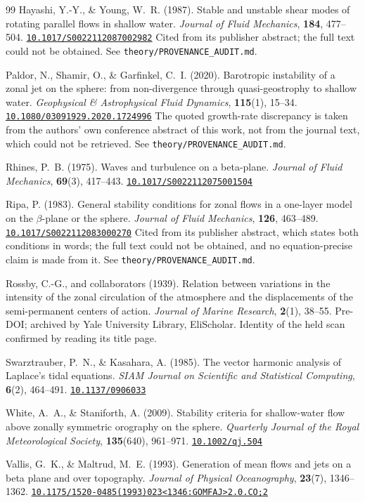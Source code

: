 \documentclass[11pt,a4paper]{article}
\newcommand{\doilink}[1]{\href{https://doi.org/#1}{\nolinkurl{#1}}}
\newcommand{\file}[1]{\texttt{\nolinkurl{#1}}}
\begin{document}
\begin{thebibliography}{99}
Hayashi, Y.-Y., \& Young, W.~R. (1987).
Stable and unstable shear modes of rotating parallel flows in shallow water.
\emph{Journal of Fluid Mechanics}, \textbf{184}, 477--504.
\doilink{10.1017/S0022112087002982}
Cited from its publisher abstract; the full text could not be obtained. See
\file{theory/PROVENANCE_AUDIT.md}.

Paldor, N., Shamir, O., \& Garfinkel, C.~I. (2020).
Barotropic instability of a zonal jet on the sphere: from non-divergence through
quasi-geostrophy to shallow water.
\emph{Geophysical \& Astrophysical Fluid Dynamics}, \textbf{115}(1), 15--34.
\doilink{10.1080/03091929.2020.1724996}
The quoted growth-rate discrepancy is taken from the authors' own conference
abstract of this work, not from the journal text, which could not be retrieved.
See \file{theory/PROVENANCE_AUDIT.md}.

Rhines, P.~B. (1975).
Waves and turbulence on a beta-plane.
\emph{Journal of Fluid Mechanics}, \textbf{69}(3), 417--443.
\doilink{10.1017/S0022112075001504}

Ripa, P. (1983).
General stability conditions for zonal flows in a one-layer model on the
$\beta$-plane or the sphere.
\emph{Journal of Fluid Mechanics}, \textbf{126}, 463--489.
\doilink{10.1017/S0022112083000270}
Cited from its publisher abstract, which states both conditions in words; the
full text could not be obtained, and no equation-precise claim is made from it.
See \file{theory/PROVENANCE_AUDIT.md}.

Rossby, C.-G., and collaborators (1939).
Relation between variations in the intensity of the zonal circulation of the
atmosphere and the displacements of the semi-permanent centers of action.
\emph{Journal of Marine Research}, \textbf{2}(1), 38--55.
Pre-DOI; archived by Yale University Library, EliScholar. Identity of the held
scan confirmed by reading its title page.

Swarztrauber, P.~N., \& Kasahara, A. (1985).
The vector harmonic analysis of Laplace's tidal equations.
\emph{SIAM Journal on Scientific and Statistical Computing}, \textbf{6}(2),
464--491. \doilink{10.1137/0906033}

White, A.~A., \& Staniforth, A. (2009).
Stability criteria for shallow-water flow above zonally symmetric orography on
the sphere.
\emph{Quarterly Journal of the Royal Meteorological Society}, \textbf{135}(640),
961--971. \doilink{10.1002/qj.504}

Vallis, G.~K., \& Maltrud, M.~E. (1993).
Generation of mean flows and jets on a beta plane and over topography.
\emph{Journal of Physical Oceanography}, \textbf{23}(7), 1346--1362.
\doilink{10.1175/1520-0485(1993)023<1346:GOMFAJ>2.0.CO;2}

\end{thebibliography}
\end{document}

